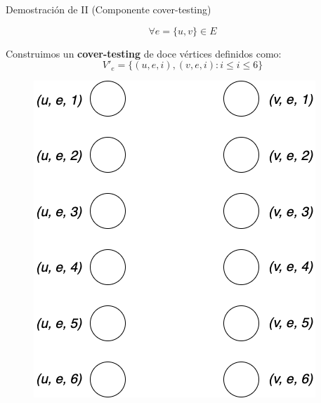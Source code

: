 \documentclass{beamer}
\begin{document}
\begin{frame}{Demostración de II (Componente cover-testing)}
    \begin{block}{}
        \[\forall e = \{u, v\} \in E\]
    \end{block}
    Construimos un \textbf{cover-testing} de doce vértices definidos como:
    \[V'_e = \{(u, e, i),(v,e,i) : i \le i \le 6\}\]
    \begin{figure}
        \centering
        \includegraphics[scale=0.3]{images/cover-testing-1.png}
        \label{fig:my_label}
    \end{figure}
\end{frame}
\end{document}
